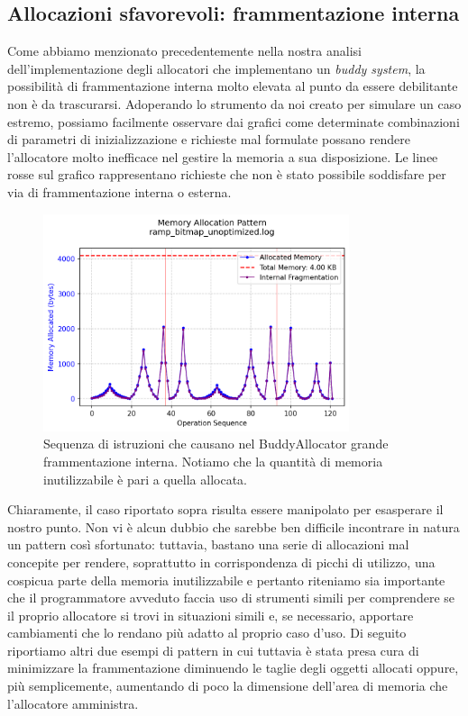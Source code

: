 \subsection{Allocazioni sfavorevoli: frammentazione interna}

Come abbiamo menzionato precedentemente nella nostra analisi dell'implementazione degli allocatori che implementano un \textit{buddy system}, la possibilità di frammentazione interna molto elevata al punto da essere debilitante non è da trascurarsi. Adoperando lo strumento da noi creato per simulare un caso estremo, possiamo facilmente osservare dai grafici come determinate combinazioni di parametri di inizializzazione e richieste mal formulate possano rendere l'allocatore molto inefficace nel gestire la memoria a sua disposizione. Le linee rosse sul grafico rappresentano richieste che non è stato possibile soddisfare per via di frammentazione interna o esterna.
\begin{figure}[H]
  \centering
  \includegraphics[width=0.8\textwidth]{graphs/ramp_bitmap_unoptimized.png}
  \caption{Sequenza di istruzioni che causano nel BuddyAllocator grande frammentazione interna. Notiamo che la quantità di memoria inutilizzabile è pari a quella allocata.}
  \label{fig:ramp_bitmap_unoptimized}
\end{figure}

Chiaramente, il caso riportato sopra risulta essere manipolato per esasperare il nostro punto. Non vi è alcun dubbio che sarebbe ben difficile incontrare in natura un pattern così sfortunato: tuttavia, bastano una serie di allocazioni mal concepite per rendere, soprattutto in corrispondenza di picchi di utilizzo, una cospicua parte della memoria inutilizzabile e pertanto riteniamo sia importante che il programmatore avveduto faccia uso di strumenti simili per comprendere se il proprio allocatore si trovi in situazioni simili e, se necessario, apportare cambiamenti che lo rendano più adatto al proprio caso d'uso. Di seguito riportiamo altri due esempi di pattern in cui tuttavia è stata presa cura di minimizzare la frammentazione diminuendo le taglie degli oggetti allocati oppure, più semplicemente, aumentando di poco la dimensione dell'area di memoria che l'allocatore amministra.

